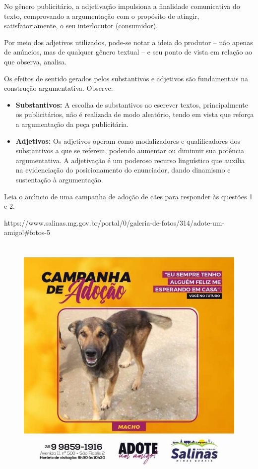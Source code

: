 \begin{itemize}
\begin{itemize}
{\begin{itemize}
\begin{itemize}
{No gênero publicitário, a adjetivação impulsiona a finalidade
comunicativa do texto, comprovando a argumentação com o propósito de
atingir, satisfatoriamente, o seu interlocutor (consumidor).

Por meio dos adjetivos utilizados, pode-se notar a ideia do produtor --
não apenas de anúncios, mas de qualquer gênero textual -- e seu ponto de
vista em relação ao que observa, analisa.

Os efeitos de sentido gerados pelos substantivos e adjetivos são
fundamentais na construção argumentativa. Observe:

\begin{itemize}
\item
  \textbf{Substantivos:} A escolha de substantivos ao escrever textos,
  principalmente os publicitários, não é realizada de modo aleatório,
  tendo em vista que reforça a argumentação da peça publicitária.
\item
  \textbf{Adjetivos:} Os adjetivos operam como modalizadores e
  qualificadores dos substantivos a que se referem, podendo aumentar ou
  diminuir sua potência argumentativa. A adjetivação é um poderoso
  recurso linguístico que auxilia na evidenciação do posicionamento do
  enunciador, dando dinamismo e sustentação à argumentação.
\end{itemize}
}


Leia o anúncio de uma campanha de adoção de cães para responder às
questões 1 e 2.

https://www.salinas.mg.gov.br/portal/0/galeria-de-fotos/314/adote-um-amigo!\#fotos-5

\begin{figure}
\centering
\includegraphics[width=4.96806in,height=4.96806in]{./_SAEB_9_POR/media/image19.jpeg}
\caption{}
\end{figure}


\end{itemize}
\end{itemize}}
\end{itemize}
\end{itemize}
